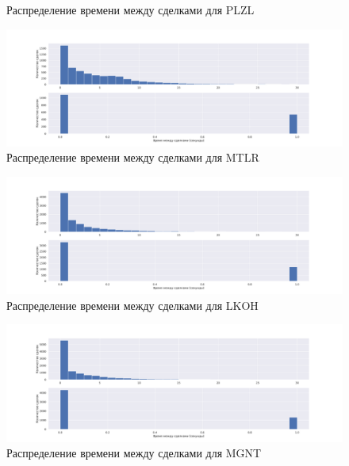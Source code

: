 \begin{appendices}
\begin{figure}
                \caption{Распределение времени между сделками для PLZL}
                \label{app}
        \end{figure}
        \begin{figure}
                \includegraphics[scale=0.35]{fig/timedistr/SE/MTLR.pdf}
                \caption{Распределение времени между сделками для MTLR}
                \label{app}
        \end{figure}
        \begin{figure}
            \includegraphics[scale=0.35]{fig/timedistr/SE/LKOH.pdf}
            \caption{Распределение времени между сделками для LKOH}
            \label{app}
        \end{figure}
        \begin{figure}
                \includegraphics[scale=0.35]{fig/timedistr/SE/MGNT.pdf}
                \caption{Распределение времени между сделками для MGNT}
                \label{app}
        \end{figure}


\end{appendices}
